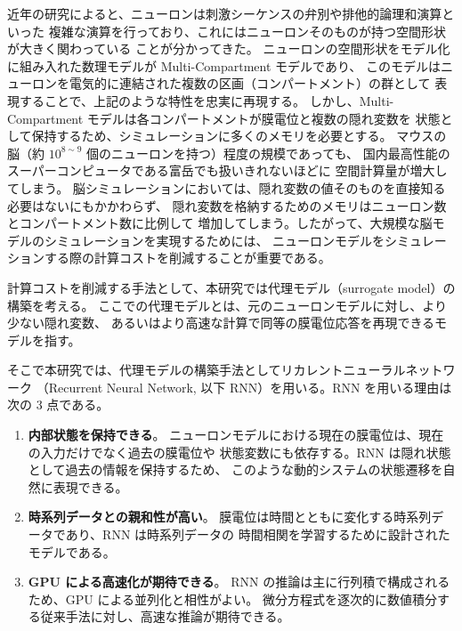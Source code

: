 \documentclass[a4paper,11pt,openany]{ltjsreport}
\begin{document}
近年の研究によると、ニューロンは刺激シーケンスの弁別や排他的論理和演算といった
複雑な演算を行っており、これにはニューロンそのものが持つ空間形状が大きく関わっている
ことが分かってきた\cite{gidon2020,branco2010}。
ニューロンの空間形状をモデル化に組み入れた数理モデルが Multi-Compartment モデルであり、
このモデルはニューロンを電気的に連結された複数の区画（コンパートメント）の群として
表現することで、上記のような特性を忠実に再現する。
しかし、Multi-Compartment モデルは各コンパートメントが膜電位と複数の隠れ変数を
状態として保持するため、シミュレーションに多くのメモリを必要とする\cite{yamazaki2021}。
マウスの脳（約 $10^{8\sim9}$ 個のニューロンを持つ）程度の規模であっても、
国内最高性能のスーパーコンピュータである富岳でも扱いきれないほどに
空間計算量が増大してしまう\cite{kobayashi2024}。
脳シミュレーションにおいては、隠れ変数の値そのものを直接知る必要はないにもかかわらず、
隠れ変数を格納するためのメモリはニューロン数とコンパートメント数に比例して
増加してしまう。したがって、大規模な脳モデルのシミュレーションを実現するためには、
ニューロンモデルをシミュレーションする際の計算コストを削減することが重要である。

計算コストを削減する手法として、本研究では代理モデル（surrogate model）の構築を考える。
ここでの代理モデルとは、元のニューロンモデルに対し、より少ない隠れ変数、
あるいはより高速な計算で同等の膜電位応答を再現できるモデルを指す。

そこで本研究では、代理モデルの構築手法としてリカレントニューラルネットワーク
（Recurrent Neural Network, 以下 RNN）を用いる。RNN を用いる理由は次の 3 点である。

\begin{enumerate}[label=(\arabic*)]
  \item \textbf{内部状態を保持できる}。
        ニューロンモデルにおける現在の膜電位は、現在の入力だけでなく過去の膜電位や
        状態変数にも依存する。RNN は隠れ状態として過去の情報を保持するため、
        このような動的システムの状態遷移を自然に表現できる。
  \item \textbf{時系列データとの親和性が高い}。
        膜電位は時間とともに変化する時系列データであり、RNN は時系列データの
        時間相関を学習するために設計されたモデルである。
  \item \textbf{GPU による高速化が期待できる}。
        RNN の推論は主に行列積で構成されるため、GPU による並列化と相性がよい。
        微分方程式を逐次的に数値積分する従来手法に対し、高速な推論が期待できる。
\end{enumerate}
\end{document}
